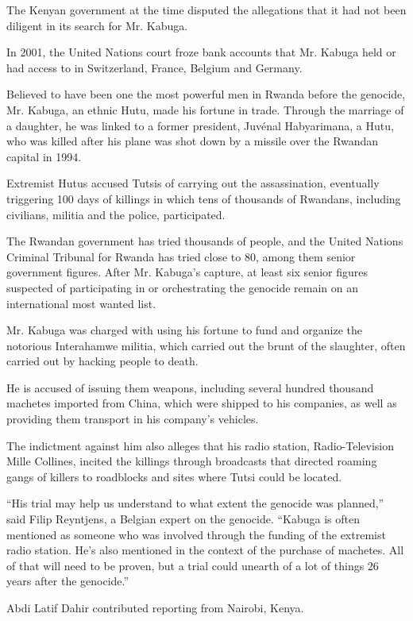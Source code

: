 The Kenyan government at the time disputed the allegations that it had
not been diligent in its search for Mr. Kabuga.

In 2001, the United Nations court froze bank accounts that Mr. Kabuga
held or had access to in Switzerland, France, Belgium and Germany.

Believed to have been one the most powerful men in Rwanda before the
genocide, Mr. Kabuga, an ethnic Hutu, made his fortune in trade. Through
the marriage of a daughter, he was linked to a former president, Juvénal
Habyarimana, a Hutu, who was killed after his plane was shot down by a
missile over the Rwandan capital in 1994.

Extremist Hutus accused Tutsis of carrying out the assassination,
eventually triggering 100 days of killings in which tens of thousands of
Rwandans, including civilians, militia and the police, participated.

The Rwandan government has tried thousands of people, and the United
Nations Criminal Tribunal for Rwanda has tried close to 80, among them
senior government figures. After Mr. Kabuga's capture, at least six
senior figures suspected of participating in or orchestrating the
genocide remain on an international most wanted list.

Mr. Kabuga was charged with using his fortune to fund and organize the
notorious Interahamwe militia, which carried out the brunt of the
slaughter, often carried out by hacking people to death.

He is accused of issuing them weapons, including several hundred
thousand machetes imported from China, which were shipped to his
companies, as well as providing them transport in his company's
vehicles.

The indictment against him also alleges that his radio station,
Radio-Television Mille Collines, incited the killings through broadcasts
that directed roaming gangs of killers to roadblocks and sites where
Tutsi could be located.

``His trial may help us understand to what extent the genocide was
planned,'' said Filip Reyntjens, a Belgian expert on the genocide.
``Kabuga is often mentioned as someone who was involved through the
funding of the extremist radio station. He's also mentioned in the
context of the purchase of machetes. All of that will need to be proven,
but a trial could unearth of a lot of things 26 years after the
genocide.''

Abdi Latif Dahir contributed reporting from Nairobi, Kenya.

